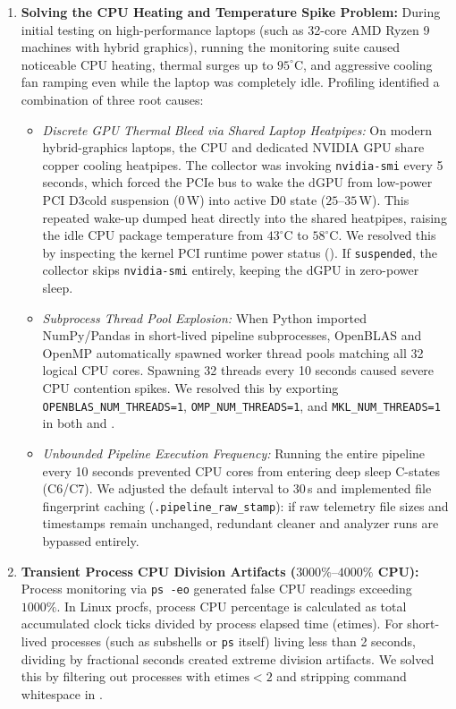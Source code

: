 \begin{enumerate}
    \item \textbf{Solving the CPU Heating and Temperature Spike Problem:}
    During initial testing on high-performance laptops (such as 32-core AMD Ryzen 9 machines with hybrid graphics), running the monitoring suite caused noticeable CPU heating, thermal surges up to $95^\circ$C, and aggressive cooling fan ramping even while the laptop was completely idle. Profiling identified a combination of three root causes:
    \begin{itemize}
        \item \textit{Discrete GPU Thermal Bleed via Shared Laptop Heatpipes:} On modern hybrid-graphics laptops, the CPU and dedicated NVIDIA GPU share copper cooling heatpipes. The collector was invoking \texttt{nvidia-smi} every 5 seconds, which forced the PCIe bus to wake the dGPU from low-power PCI D3cold suspension ($0$\,W) into active D0 state ($25\text{--}35$\,W). This repeated wake-up dumped heat directly into the shared heatpipes, raising the idle CPU package temperature from $43^\circ$C to $58^\circ$C. We resolved this by inspecting the kernel PCI runtime power status (). If \texttt{suspended}, the collector skips \texttt{nvidia-smi} entirely, keeping the dGPU in zero-power sleep.
        \item \textit{Subprocess Thread Pool Explosion:} When Python imported NumPy/Pandas in short-lived pipeline subprocesses, OpenBLAS and OpenMP automatically spawned worker thread pools matching all 32 logical CPU cores. Spawning 32 threads every 10 seconds caused severe CPU contention spikes. We resolved this by exporting \texttt{OPENBLAS\_NUM\_THREADS=1}, \texttt{OMP\_NUM\_THREADS=1}, and \texttt{MKL\_NUM\_THREADS=1} in both  and .
        \item \textit{Unbounded Pipeline Execution Frequency:} Running the entire pipeline every 10 seconds prevented CPU cores from entering deep sleep C-states (C6/C7). We adjusted the default interval to 30\,s and implemented file fingerprint caching (\texttt{.pipeline\_raw\_stamp}): if raw telemetry file sizes and timestamps remain unchanged, redundant cleaner and analyzer runs are bypassed entirely.
    \end{itemize}

    \item \textbf{Transient Process CPU Division Artifacts ($3000\%\text{--}4000\%$ CPU):}
    Process monitoring via \texttt{ps -eo} generated false CPU readings exceeding $1000\%$. In Linux procfs, process CPU percentage is calculated as total accumulated clock ticks divided by process elapsed time ($\text{etimes}$). For short-lived processes (such as subshells or \texttt{ps} itself) living less than 2 seconds, dividing by fractional seconds created extreme division artifacts. We solved this by filtering out processes with $\text{etimes} < 2$ and stripping command whitespace in .


\end{enumerate}
